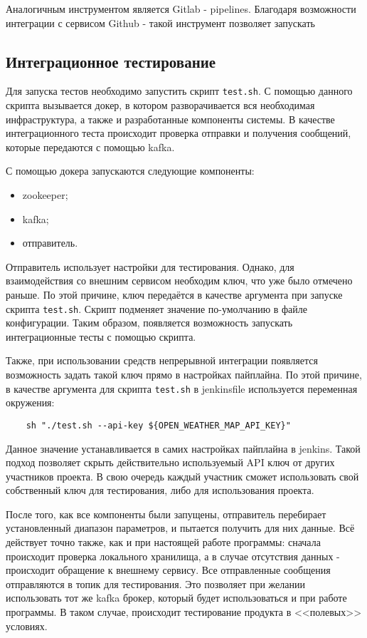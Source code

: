 Аналогичным инструментом является Gitlab - pipelines.
Благодаря возможности интеграции с сервисом Github - такой инструмент позволяет запускать 

\subsection{Интеграционное тестирование}

Для запуска тестов необходимо запустить скрипт \texttt{test.sh}.
С помощью данного скрипта вызывается докер, в котором разворачивается вся необходимая инфраструктура, а также и разработанные компоненты системы.
В качестве интеграционного теста происходит проверка отправки и получения сообщений, которые передаются с помощью kafka.

С помощью докера запускаются следующие компоненты:
\begin{itemize}
    \item zookeeper;
    \item kafka;
    \item отправитель.
\end{itemize}

Отправитель использует настройки для тестирования.
Однако, для взаимодействия со внешним сервисом необходим ключ, что уже было отмечено раньше.
По этой причине, ключ передаётся в качестве аргумента при запуске скрипта \texttt{test.sh}.
Скрипт подменяет значение по-умолчанию в файле конфигурации.
Таким образом, появляется возможность запускать интеграционные тесты с помощью скрипта.

Также, при использовании средств непрерывной интеграции появляется возможность задать такой ключ прямо в настройках пайплайна.
По этой причине, в качестве аргумента для скрипта \texttt{test.sh} в jenkinsfile используется переменная окружения:
\begin{lstlisting}
    sh "./test.sh --api-key ${OPEN_WEATHER_MAP_API_KEY}"
\end{lstlisting}

Данное значение устанавливается в самих настройках пайплайна в jenkins.
Такой подход позволяет скрыть действительно используемый API ключ от других участников проекта.
В свою очередь каждый участник сможет использовать свой собственный ключ для тестирования, либо для использования проекта.

После того, как все компоненты были запущены, отправитель перебирает установленный диапазон параметров, и пытается получить для них данные.
Всё действует точно также, как и при настоящей работе программы: сначала происходит проверка локального хранилища, а в случае отсутствия данных - происходит обращение к внешнему сервису.
Все отправленные сообщения отправляются в топик для тестирования.
Это позволяет при желании использовать тот же kafka брокер, который будет использоваться и при работе программы.
В таком случае, происходит тестирование продукта в <<полевых>> условиях.

